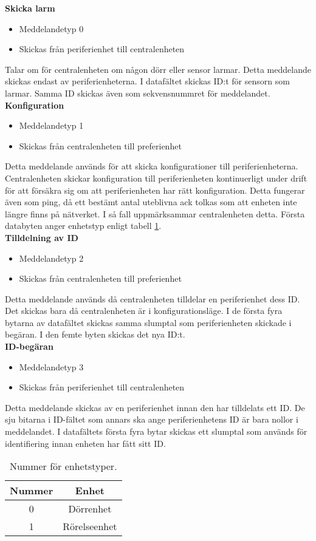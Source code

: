 \textbf{Skicka larm}
\begin{itemize}
    \item Meddelandetyp 0
    \item Skickas från periferienhet till centralenheten
\end{itemize}
Talar om för centralenheten om någon dörr eller sensor larmar. Detta meddelande skickas endast av periferienheterna. I datafältet skickas ID:t för sensorn som larmar. Samma ID skickas även som sekvensnummret för meddelandet.\\


\textbf{Konfiguration}
\begin{itemize}
    \item Meddelandetyp 1
    \item Skickas från centralenheten till preferienhet
\end{itemize}
Detta meddelande används för att skicka konfigurationer till periferienheterna.
Centralenheten skickar konfiguration till periferienheten kontinuerligt under drift för att försäkra sig om att periferienheten har rätt konfiguration. Detta fungerar även som ping, då ett bestämt antal uteblivna ack tolkas som att enheten inte längre finns på nätverket.
I så fall uppmärksammar centralenheten detta.
Första databyten anger enhetstyp enligt tabell \ref{tab:enhetstyper}.\\


\textbf{Tilldelning av ID}
\begin{itemize}
    \item Meddelandetyp 2
    \item Skickas från centralenheten till preferienhet
\end{itemize}
Detta meddelande används då centralenheten tilldelar en periferienhet dess ID. Det skickas bara då centralenheten är i konfigurationsläge. I de första fyra bytarna av datafältet skickas samma slumptal som periferienheten skickade i begäran. I den femte byten skickas det nya ID:t. \\


\textbf{ID-begäran}
\begin{itemize}
    \item Meddelandetyp 3
    \item Skickas från periferienhet till centralenheten
\end{itemize}
Detta meddelande skickas av en periferienhet innan den har tilldelats ett ID. 
De sju bitarna i ID-fältet som annars ska ange periferienhetens ID är bara nollor i meddelandet.
 I datafältets första fyra bytar skickas ett slumptal som används för identifiering 
 innan enheten har fått sitt ID.\\
\begin{table}[htb]
	\centering
	\begin{tabular}{|c|c|}
		\hline
		Nummer & Enhet \\ \hline \hline
		0 & Dörrenhet \\ \hline
		1 & Rörelseenhet \\ \hline

	\end{tabular}
	\caption{Nummer för enhetstyper.}
	\label{tab:enhetstyper}
\end{table}

